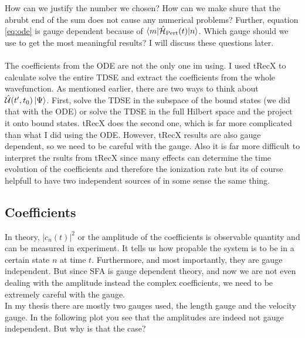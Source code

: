 How can we justify the number we chosen?
How can we make shure that the abrubt end of the sum does not cause any numerical problems?
Further, equation \eqref{eq:ode} is gauge dependent because of $\braket{m|\hat{\mathcal{H}}_{\mathrm{Pert}}(t)|n}$. 
Which gauge should we use to get the most meaningful results?
I will discuss these questions later.\\\\
The coefficients from the ODE are not the only one im using. I used tRecX to calculate solve the entire TDSE and extract the coefficients from the whole wavefunction.
As mentioned earlier, there are two ways to think about $\hat{\mathcal{U}}(t',t_0)\ket{\Psi}$. 
First, solve the TDSE in the subspace of the bound states (we did that with the ODE) or solve the TDSE in the full Hilbert space and the project it onto bound states. 
tRecX does the second one, which is far more complicated than what I did using the ODE.
However, tRecX results are also gauge dependent, so we need to be careful with the gauge.
Also it is far more difficult to interpret the rsults from tRecX since many effects can determine the time evolution of the coefficients and therefore the ionization rate but its of course helpfull to have two independent sources of in some sense the same thing.









\subsection{Coefficients}
In theory, $|c_n(t)|^2$ or the amplitude of the coefficients is observable quantity and can be measured in experiment.
It tells us how propable the system is to be in a certain state $n$ at time $t$.
Furthermore, and most importantly, they are gauge independent.
But since SFA is gauge dependent theory, and now we are not even dealing with the amplitude instead the complex coefficients, we need to be extremely careful with the gauge.\\
In my thesis there are mostly two gauges used, the length gauge and the velocity gauge. 
In the following plot you see that the amplitudes are indeed not gauge independent. But why is that the case?\\\\


